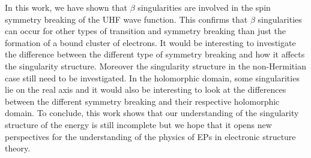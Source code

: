 \documentclass[11pt,a4paper]{article}
\begin{document}
In this work, we have shown that $\beta$ singularities are involved in the spin symmetry breaking of the UHF wave function. 
This confirms that $\beta$ singularities can occur for other types of transition and symmetry breaking than just the formation of a bound cluster of electrons. 
It would be interesting to investigate the difference between the different type of symmetry breaking and how it affects the singularity structure. 
Moreover the singularity structure in the non-Hermitian case still need to be investigated. 
In the holomorphic domain, some singularities lie on the real axis and it would also be interesting to look at the differences between the different symmetry breaking and their respective holomorphic domain. 
To conclude, this work shows that our understanding of the singularity structure of the energy is still incomplete but we hope that it opens new perspectives for the understanding of the physics of EPs in electronic structure theory.

\newpage
\printbibliography
\end{document}
